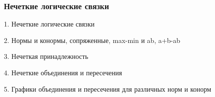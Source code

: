\documentclass[24pt,pdf,hyperref={unicode}]{beamer}
\begin{document}
\begin{frame}
\end{frame}


\begin{frame}\frametitle{Нечеткие логические связки}
1. Нечеткие логические связки

2. Нормы и конормы, сопряженные, max-min и ab, a+b-ab

3. Нечеткая принадлежность

4. Нечеткие объединения и пересечения

5. Графики объединения и пересечения для различных норм и конорм
\end{frame}
\end{document}
